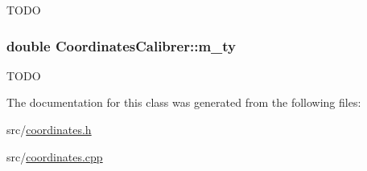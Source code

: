 \label{classCoordinatesCalibrer_ad3dcf12acb15253d8467440ccf917581}
TODO \hypertarget{classCoordinatesCalibrer_a7e9c56017cf2f279564f2aba38aa146b}{
\subsubsection[{m\_\-ty}]{\setlength{\rightskip}{0pt plus 5cm}double {\bf CoordinatesCalibrer::m\_\-ty}}}
\label{classCoordinatesCalibrer_a7e9c56017cf2f279564f2aba38aa146b}
TODO 

The documentation for this class was generated from the following files:\begin{DoxyCompactItemize}
\item 
src/\hyperlink{coordinates_8h}{coordinates.h}\item 
src/\hyperlink{coordinates_8cpp}{coordinates.cpp}\end{DoxyCompactItemize}
